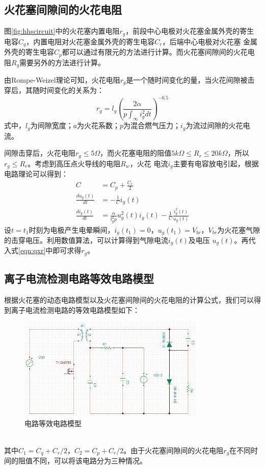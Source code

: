 \subsection{火花塞间隙间的火花电阻}
图\ref{fig:hhscircuit}中的火花塞内置电阻$r_{g}$，前段中心电极对火花塞金属外壳的寄生电容$C_{q}$，内置电阻对火花塞金属外壳的寄生电容$C_{r}$，后端中心电极对火花塞
金属外壳的寄生电容$C_{p}$都可以通过有限元的方法进行计算\cite{zyl2011,wyj1999}。而火花塞间隙间的火花电阻$R_{g}$需要另外的方法进行计算。
\par 由Rompe-Weizel理论可知，火花电阻$r_{g}$是一个随时间变化的量，当火花间隙被击穿后，其随时间变化的关系为：
\begin{equation}
	\label{eqn:qxr}
	r_{g}=l_{g}(\frac{2\alpha}{p\int_{\infty}i_{g}^{2}dt})^{-0.5}
\end{equation}
式中，$l_{g}$为间隙宽度；$a$为火花系数；$p$为混合燃气压力；$i_{g}$为流过间隙的火花电流。
\par 间隙击穿后，火花电阻$r_{g}\leq5\Omega$，而火花塞电阻的阻值$5k\Omega\leq R_{r}\leq 20k\Omega$，所以$r_{g}\leq R_{r}$。考虑到高压点火导线的电阻$R_{w}$，火花
电流$i_{g}$主要有电容放电引起，根据电路理论可以得到：
\begin{align}
C &= C_{p}+\frac{C_{r}}{2}\\
\frac{du_{g}(t)}{dt}&=-\frac{1}{C}i_{g}(t)\\
\frac{di_{g}(t)}{dt}&=\frac{\alpha}{l_{g}^{2}p}u_{g}^{2}(t)i_{g}(t)-\frac{1}{C}\frac{i_{g}^{2}(t)}{u_{g}(t)}
\end{align}
设$t=t_{1}$时刻为电极产生电晕瞬间，$i_{g}(t_{1})=0$，$u_{g}(t_{1})=V_{br}$，$V_{br}$为火花塞气隙的击穿电压。利用数值算法，可以计算得到气隙电流$i_{g}(t)$及电压
$u_{g}(t)$。再代入式\ref{eqn:qxr}中即可求得$r_{g}$。
\subsection{离子电流检测电路等效电路模型}
根据火花塞的动态电路模型以及火花塞间隙间的火花电阻的计算公式，我们可以得到离子电流检测电路的等效电路模型如下：
\begin{figure}[!h]
	\centering
	\includegraphics[width=0.8\textwidth]{thesis_figure/cmp_circuit}
	\caption{电路等效电路模型}
	\label{fig:cmp_circuit}
\end{figure}
\\其中$C_{1}=C_{q}+C_{r}/2$，$C_{2}=C_{p}+C_{r}/2$。由于火花塞间隙间的火花电阻$r_{g}$在不同时间的阻值不同，可以将该电路分为三种情况。
